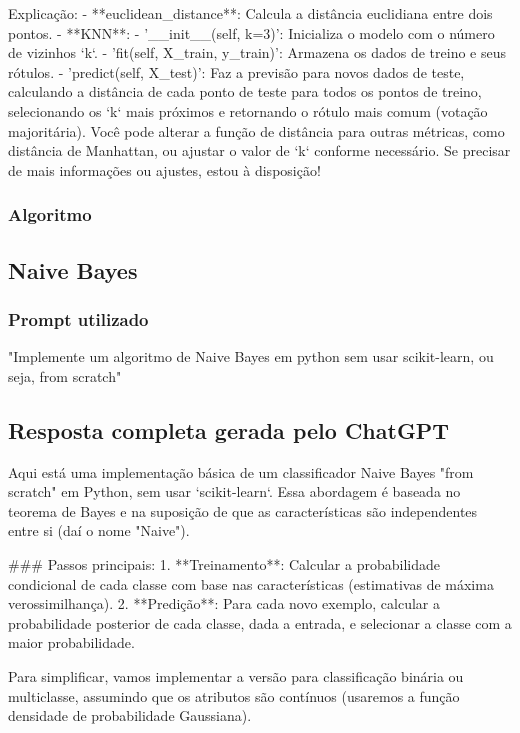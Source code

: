 \documentclass[12pt]{article}
\begin{document}
Explicação:
- **euclidean\_distance**: Calcula a distância euclidiana entre dois pontos.
- **KNN**:
  - '\_\_init\_\_(self, k=3)': Inicializa o modelo com o número de vizinhos `k`.
  - 'fit(self, X\_train, y\_train)': Armazena os dados de treino e seus rótulos.
  - 'predict(self, X\_test)': Faz a previsão para novos dados de teste, calculando a distância de cada ponto de teste para todos os pontos de treino, selecionando os `k` mais próximos e retornando o rótulo mais comum (votação majoritária).
 Você pode alterar a função de distância para outras métricas, como distância de Manhattan, ou ajustar o valor de `k` conforme necessário.
 Se precisar de mais informações ou ajustes, estou à disposição!

\subsubsection{Algoritmo}


\subsection{Naive Bayes}
\subsubsection{Prompt utilizado}
"Implemente um algoritmo de Naive Bayes em python sem usar scikit-learn, ou seja, from scratch"

\subsection{Resposta completa gerada pelo ChatGPT}

Aqui está uma implementação básica de um classificador Naive Bayes "from scratch" em Python, sem usar `scikit-learn`. Essa abordagem é baseada no teorema de Bayes e na suposição de que as características são independentes entre si (daí o nome "Naive").

### Passos principais:
1. **Treinamento**: Calcular a probabilidade condicional de cada classe com base nas características (estimativas de máxima verossimilhança).
2. **Predição**: Para cada novo exemplo, calcular a probabilidade posterior de cada classe, dada a entrada, e selecionar a classe com a maior probabilidade.

Para simplificar, vamos implementar a versão para classificação binária ou multiclasse, assumindo que os atributos são contínuos (usaremos a função densidade de probabilidade Gaussiana).
\end{document}
